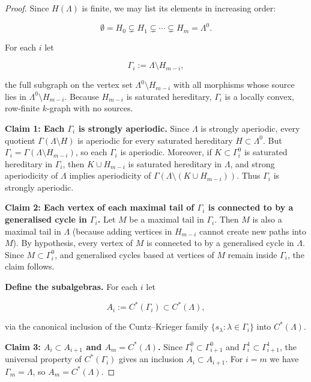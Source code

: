 \documentclass[10pt,a4paper]{amsart}
\begin{document}
\begin{proof}
Since $H(\Lambda)$ is finite, we may list its elements in increasing
order:


\[
\emptyset = H_0 \subsetneq H_1 \subsetneq \cdots \subsetneq H_m = \Lambda^0.
\]


For each $i$ let


\[
\Gamma_i := \Lambda\setminus H_{m-i},
\]


the full subgraph on the vertex set $\Lambda^0\setminus H_{m-i}$ with
all morphisms whose source lies in $\Lambda^0\setminus H_{m-i}$.
Because $H_{m-i}$ is saturated hereditary, $\Gamma_i$ is a locally
convex, row-finite $k$-graph with no sources.

\smallskip

\textbf{Claim 1: Each $\Gamma_i$ is strongly aperiodic.}
Since $\Lambda$ is strongly aperiodic, every quotient
$\Gamma(\Lambda\setminus H)$ is aperiodic for every saturated hereditary
$H\subset\Lambda^0$. But $\Gamma_i = \Gamma(\Lambda\setminus H_{m-i})$,
so each $\Gamma_i$ is aperiodic. Moreover, if $K\subset\Gamma_i^0$
is saturated hereditary in $\Gamma_i$, then $K\cup H_{m-i}$ is
saturated hereditary in $\Lambda$, and strong aperiodicity of
$\Lambda$ implies aperiodicity of $\Gamma(\Lambda\setminus (K\cup H_{m-i}))$.
Thus $\Gamma_i$ is strongly aperiodic.

\smallskip

\textbf{Claim 2: Each vertex of each maximal tail of $\Gamma_i$ is
connected to by a generalised cycle in $\Gamma_i$.}
Let $M$ be a maximal tail in $\Gamma_i$. Then $M$ is also a maximal
tail in $\Lambda$ (because adding vertices in $H_{m-i}$ cannot create
new paths into $M$). By hypothesis, every vertex of $M$ is connected
to by a generalised cycle in $\Lambda$. Since $M\subset\Gamma_i^0$,
and generalised cycles based at vertices of $M$ remain inside
$\Gamma_i$, the claim follows.

\smallskip

\textbf{Define the subalgebras.}
For each $i$ let


\[
A_i := C^*(\Gamma_i) \subset C^*(\Lambda),
\]


via the canonical inclusion of the Cuntz--Krieger family
$\{s_\lambda : \lambda\in\Gamma_i\}$ into $C^*(\Lambda)$.

\smallskip

\textbf{Claim 3: $A_i \subset A_{i+1}$ and $A_m = C^*(\Lambda)$.}
Since $\Gamma_i^0 \subset \Gamma_{i+1}^0$ and
$\Gamma_i^1 \subset \Gamma_{i+1}^1$, the universal property of
$C^*(\Gamma_i)$ gives an inclusion $A_i\subset A_{i+1}$.  
For $i=m$ we have $\Gamma_m = \Lambda$, so $A_m=C^*(\Lambda)$.


\end{proof}
\end{document}
